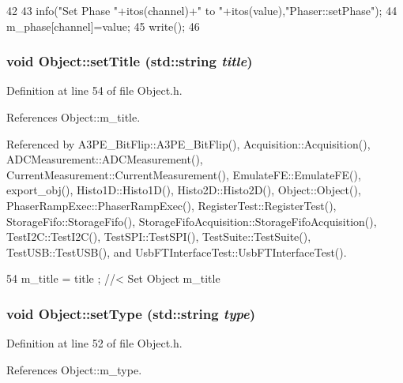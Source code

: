 \begin{DoxyCode}
42                                                            {
43     info("Set Phase "+itos(channel)+" to "+itos(value),"Phaser::setPhase");
44     m_phase[channel]=value;
45     write();
46   }
\end{DoxyCode}
\hypertarget{classObject_a89557dbbad5bcaa02652f5d7fa35d20f}{
\subsubsection[{setTitle}]{\setlength{\rightskip}{0pt plus 5cm}void Object::setTitle (std::string {\em title})}}
\label{classObject_a89557dbbad5bcaa02652f5d7fa35d20f}


Definition at line 54 of file Object.h.

References Object::m\_\-title.

Referenced by A3PE\_\-BitFlip::A3PE\_\-BitFlip(), Acquisition::Acquisition(), ADCMeasurement::ADCMeasurement(), CurrentMeasurement::CurrentMeasurement(), EmulateFE::EmulateFE(), export\_\-obj(), Histo1D::Histo1D(), Histo2D::Histo2D(), Object::Object(), PhaserRampExec::PhaserRampExec(), RegisterTest::RegisterTest(), StorageFifo::StorageFifo(), StorageFifoAcquisition::StorageFifoAcquisition(), TestI2C::TestI2C(), TestSPI::TestSPI(), TestSuite::TestSuite(), TestUSB::TestUSB(), and UsbFTInterfaceTest::UsbFTInterfaceTest().


\begin{DoxyCode}
54 { m_title = title ; } //< Set Object m_title
\end{DoxyCode}
\hypertarget{classObject_aae534cc9d982bcb9b99fd505f2e103a5}{
\subsubsection[{setType}]{\setlength{\rightskip}{0pt plus 5cm}void Object::setType (std::string {\em type})}}
\label{classObject_aae534cc9d982bcb9b99fd505f2e103a5}


Definition at line 52 of file Object.h.

References Object::m\_\-type.

